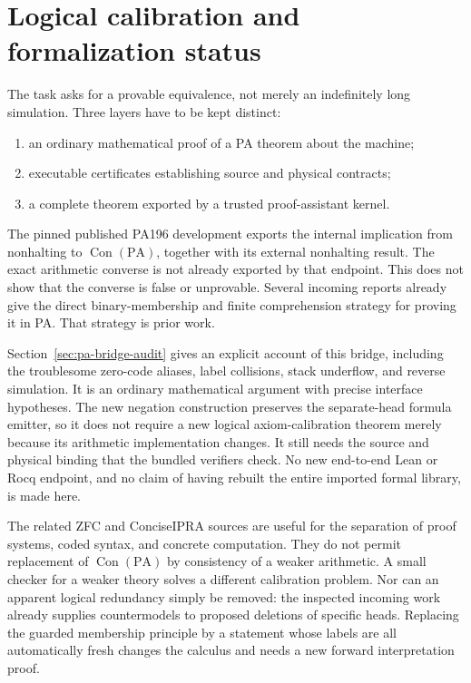 \documentclass[11pt,a4paper]{article}
\newcommand{\PA}{\mathrm{PA}}
\newcommand{\Con}{\operatorname{Con}}
\begin{document}
\section{Logical calibration and formalization status}

The task asks for a provable equivalence, not merely an indefinitely long
simulation. Three layers have to be kept distinct:
\begin{enumerate}
\item an ordinary mathematical proof of a PA theorem about the machine;
\item executable certificates establishing source and physical contracts;
\item a complete theorem exported by a trusted proof-assistant kernel.
\end{enumerate}
The pinned published PA196 development exports the internal implication
from nonhalting to $\Con(\PA)$, together with its external nonhalting result.
The exact arithmetic converse is not already exported by that endpoint.
This does not show that the converse is false or unprovable. Several
incoming reports already give the direct binary-membership and finite
comprehension strategy for proving it in PA. That strategy is prior work.

Section~\ref{sec:pa-bridge-audit} gives an explicit account of this bridge,
including the troublesome zero-code aliases, label collisions, stack
underflow, and reverse simulation. It is an ordinary mathematical argument
with precise interface hypotheses. The new negation construction preserves
the separate-head formula emitter, so it does not require a new logical
axiom-calibration theorem merely because its arithmetic implementation
changes. It still needs the source and physical binding that the bundled
verifiers check. No new end-to-end Lean or Rocq endpoint, and no claim of
having rebuilt the entire imported formal library, is made here.

The related ZFC and ConciseIPRA sources are useful for the separation of
proof systems, coded syntax, and concrete computation. They do not permit
replacement of $\Con(\PA)$ by consistency of a weaker arithmetic. A small
checker for a weaker theory solves a different calibration problem. Nor
can an apparent logical redundancy simply be removed: the inspected
incoming work already supplies countermodels to proposed deletions of
specific heads. Replacing the guarded membership principle by a statement
whose labels are all automatically fresh changes the calculus and needs
a new forward interpretation proof.
\end{document}
